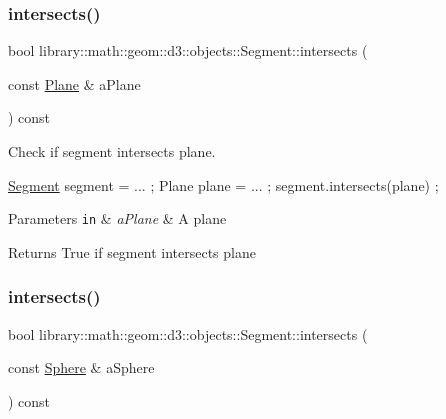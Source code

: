 \subsubsection{\texorpdfstring{intersects()}{intersects()}\hspace{0.1cm}{\footnotesize\ttfamily [1/3]}}
{\footnotesize\ttfamily bool library\+::math\+::geom\+::d3\+::objects\+::\+Segment\+::intersects (\begin{DoxyParamCaption}\item[{const \hyperlink{classlibrary_1_1math_1_1geom_1_1d3_1_1objects_1_1_plane}{Plane} \&}]{a\+Plane }\end{DoxyParamCaption}) const}



Check if segment intersects plane. 


\begin{DoxyCode}
\hyperlink{classlibrary_1_1math_1_1geom_1_1d3_1_1objects_1_1_segment_a5562342d1edf2f52e37ce1bc138ee7d7}{Segment} segment = ... ;
Plane plane = ... ;
segment.intersects(plane) ;
\end{DoxyCode}



\begin{DoxyParams}[1]{Parameters}
\mbox{\tt in}  & {\em a\+Plane} & A plane \\
\hline
\end{DoxyParams}
\begin{DoxyReturn}{Returns}
True if segment intersects plane 
\end{DoxyReturn}
\mbox{\label{classlibrary_1_1math_1_1geom_1_1d3_1_1objects_1_1_segment_a9919183ce212b474e418685db50891fc}} 
\subsubsection{\texorpdfstring{intersects()}{intersects()}\hspace{0.1cm}{\footnotesize\ttfamily [2/3]}}
{\footnotesize\ttfamily bool library\+::math\+::geom\+::d3\+::objects\+::\+Segment\+::intersects (\begin{DoxyParamCaption}\item[{const \hyperlink{classlibrary_1_1math_1_1geom_1_1d3_1_1objects_1_1_sphere}{Sphere} \&}]{a\+Sphere }\end{DoxyParamCaption}) const}



